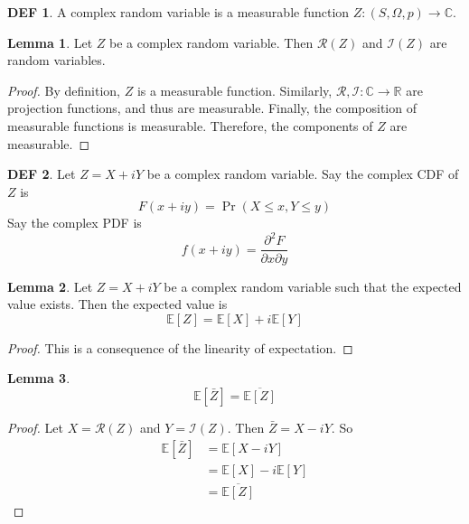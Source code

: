 \documentclass{article}
\theoremstyle{definition}\newtheorem{definition}{DEF}
\theoremstyle{lemma}\newtheorem{lemma}{Lemma}
\theoremstyle{corrolary}\newtheorem{corrolary}{Cor}
\begin{document}
\begin{definition}
A complex random variable is a measurable function $Z: (S, \Omega, p) \rightarrow \mathbb{C}$.
\end{definition}

\begin{lemma}
Let $Z$ be a complex random variable.
Then $\mathcal{R}(Z)$ and $\mathcal{I}(Z)$ are random variables.
\end{lemma}
\begin{proof}
By definition, $Z$ is a measurable function.
Similarly, $\mathcal{R}, \mathcal{I}: \mathbb{C}\rightarrow \mathbb{R}$ are projection functions, and thus are measurable.
Finally, the composition of measurable functions is measurable.
Therefore, the components of $Z$ are measurable.
\end{proof}

\begin{definition}
Let $Z=X+iY$ be a complex random variable.
Say the complex CDF of $Z$ is
\begin{equation}
F(x+iy)=\Pr(X\leq x, Y \leq y)
\end{equation}
Say the complex PDF is
\begin{equation}
f(x+iy)=\frac{\partial^2 F}{\partial x \partial y}
\end{equation}
\end{definition}

\begin{lemma}
Let $Z=X+iY$ be a complex random variable such that the expected value exists.
Then the expected value is
\begin{equation}
\mathbb{E}[Z] = \mathbb{E}[X] + i\mathbb{E}[Y]
\end{equation}
\end{lemma}
\begin{proof}
This is a consequence of the linearity of expectation.
\end{proof}

\begin{lemma}
\begin{equation}
\mathbb{E}[\bar{Z}] = \overline{\mathbb{E}[Z]}
\end{equation}
\end{lemma}
\begin{proof}
Let $X=\mathcal{R}(Z)$ and $Y=\mathcal{I}(Z)$.
Then $\bar{Z}=X-iY$.
So
\begin{align*}
\mathbb{E}[\bar{Z}]
&= \mathbb{E}[X-iY]\\
&=\mathbb{E}[X] -i\mathbb{E}[Y]\\
&=\overline{\mathbb{E}[Z]}
\end{align*}
\end{proof}
\end{document}

